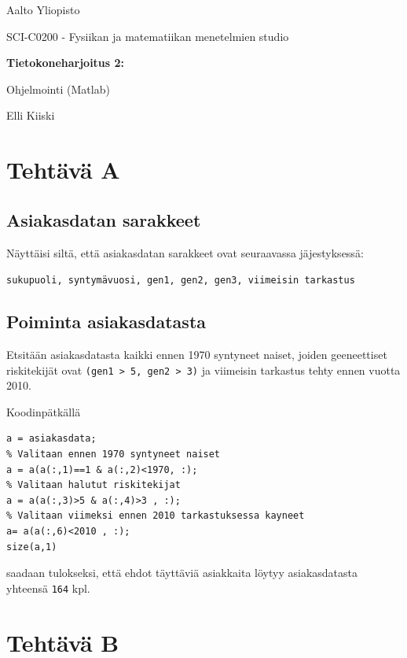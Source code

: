 \documentclass[a4paper,11pt]{article}
\begin{document}
{
\thispagestyle{empty}

{\large
Aalto Yliopisto
\par
SCI-C0200 - Fysiikan ja matematiikan menetelmien studio
}

\vspace{7cm}

{\huge \bf
Tietokoneharjoitus 2: 
\par
Ohjelmointi (Matlab)}

\vspace{2cm}

{\Large Elli Kiiski}

\clearpage

\tableofcontents

\clearpage

\section{Tehtävä A} 		  

\subsection{Asiakasdatan sarakkeet}

Näyttäisi siltä, että asiakasdatan sarakkeet ovat seuraavassa jäjestyksessä:

\texttt{sukupuoli, syntymävuosi, gen1, gen2, gen3, viimeisin tarkastus}

\subsection{Poiminta asiakasdatasta}

Etsitään asiakasdatasta kaikki ennen 1970 syntyneet naiset, joiden geeneettiset riskitekijät ovat \texttt{(gen1 > 5, gen2 > 3)} ja viimeisin tarkastus tehty ennen vuotta 2010.

Koodinpätkällä

\begin{lstlisting}
a = asiakasdata;
% Valitaan ennen 1970 syntyneet naiset
a = a(a(:,1)==1 & a(:,2)<1970, :);
% Valitaan halutut riskitekijat
a = a(a(:,3)>5 & a(:,4)>3 , :);
% Valitaan viimeksi ennen 2010 tarkastuksessa kayneet
a= a(a(:,6)<2010 , :);
size(a,1)
\end{lstlisting}

saadaan tulokseksi, että ehdot täyttäviä asiakkaita löytyy asiakasdatasta yhteensä \texttt{164} kpl.

\section{Tehtävä B}

}
\end{document}
